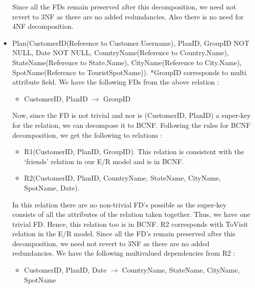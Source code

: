 \documentclass[11pt]{article}
\begin{document}
\begin{itemize}
Since  all the FDs remain preserved after this decomposition, we need not revert to 3NF as there are no added redundancies. Also there is no need for 4NF decomposition.

\item Plan(CustomerID(Reference to Customer.Username), PlanID, GroupID NOT NULL, Date NOT NULL,  CountryName(Reference to Country.Name), StateName(Reference to State.Name), CityName(Reference to City.Name), SpotName(Reference to TouristSpotName)). \newline
*GroupID corresponds to multi attribute field.\newline \newline
We have the following FDs from the above relation :
\begin{itemize}
\item CustomerID, PlanID $\rightarrow$ GroupID
\end{itemize}

Now, since the FD is not trivial and nor is (CustomerID, PlanID) a super-key for the relation, we can decompose it to BCNF. Following the rules for BCNF decomposition, we get the following to relations :
\begin{itemize}
\item R1(CustomerID, PlanID, GroupID).
This relation is consistent with the ‘friends’ relation in our E/R model and is in BCNF.
\item R2(CustomerID, PlanID, CountryName, StateName, CityName, SpotName, Date).
\end{itemize}

In this relation there are no non-trivial FD’s possible as the super-key consists of all the attributes of the relation taken together. Thus, we have one trivial FD. Hence, this relation too is in BCNF. R2 corresponds with ToVisit relation in the E/R model. \newline
Since  all the FD’s remain preserved after this decomposition, we need not revert to 3NF as there are no added redundancies. \newline
We have the following multivalued dependencies from R2 :
\begin{itemize}
\item CustomerID, PlanID, Date $\rightarrow$ CountryName, StateName, CityName, SpotName
\end{itemize}


\end{itemize}
\end{document}
